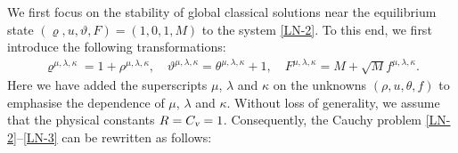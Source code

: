 \documentclass[reqno,11pt]{amsart}
\theoremstyle{plain}
\numberwithin{equation}{section}
\begin{document}
 
We first focus on the stability of global classical solutions near the equilibrium 
state $(\varrho, u, \vartheta , F) = (1, 0, 1, M)$ to the system \eqref{LN-2}. 
To  this end, we first introduce the following transformations:  
\begin{align*}  
\varrho^{\mu,\lambda,\kappa} = 1 + \rho^{\mu,\lambda,\kappa}, 
\quad \vartheta ^{\mu,\lambda,\kappa} = \theta^{\mu,\lambda,\kappa} + 1, 
\quad F^{\mu,\lambda,\kappa} = M + \sqrt{M}f^{\mu,\lambda,\kappa}.  
\end{align*}  
 Here we have added the superscripts  $\mu$, $\lambda$ and 
$\kappa$ on the unknowns $(\rho,u, \theta,f)$ to emphasise the dependence of  $\mu$, $\lambda$ and 
$\kappa$. Without loss of generality, we assume that the physical constants $ R = C_\textsl{v} =1$.
 Consequently, the Cauchy problem \eqref{LN-2}--\eqref{LN-3} can be rewritten as follows:
\end{document}
